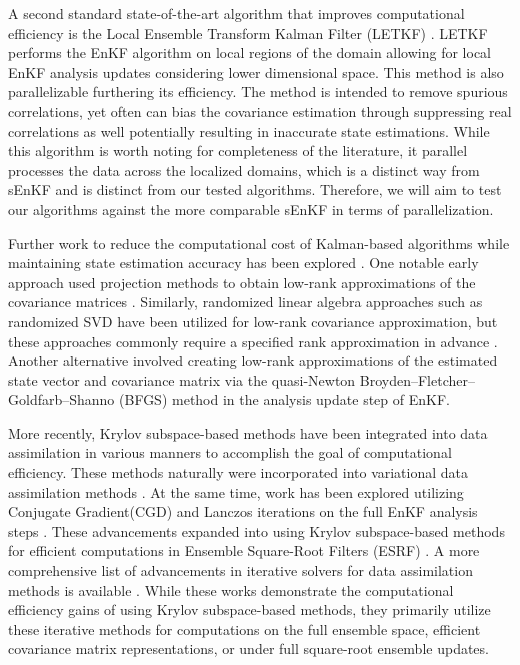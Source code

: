 \documentclass[11p]{elsarticle}
\numberwithin{equation}{section}
\begin{document}
{A second standard state-of-the-art algorithm that improves computational efficiency is the Local Ensemble Transform Kalman Filter (LETKF) \cite{Hunt2007, Szunyogh2008}.  LETKF performs the EnKF algorithm on local regions of the domain allowing for local EnKF analysis updates considering lower dimensional space.  This method is also parallelizable furthering its efficiency.  The method is intended to remove spurious correlations, yet often can bias the covariance estimation through suppressing real correlations as well potentially resulting in inaccurate state estimations.  While this algorithm is worth noting for completeness of the literature, it parallel processes the data across the localized domains, which is a distinct way from sEnKF and is distinct from our tested algorithms.  Therefore, we will aim to test our algorithms against the more comparable sEnKF in terms of parallelization.}

Further work to reduce the computational cost of Kalman-based algorithms while maintaining state estimation accuracy has been explored \cite{Bishop2001, evensen2003ensemble, Mandel2006, Nino-Ruiz2015}.  One notable early approach used projection methods to obtain low-rank approximations of the covariance matrices \cite{Dee1991, Cane1996}. 
{Similarly, randomized linear algebra approaches such as randomized SVD have been utilized for low-rank covariance approximation, but these approaches commonly require a specified rank approximation in advance \cite{Farchi2019}.}  Another alternative involved creating low-rank approximations of the estimated state vector and covariance matrix via the quasi-Newton Broyden–Fletcher–Goldfarb–Shanno (BFGS) method \cite{Auvinen2009} in the analysis update step of EnKF.

{More recently, Krylov subspace-based methods have been integrated into data assimilation in various manners to accomplish the goal of computational efficiency.  These methods naturally were incorporated into variational data assimilation methods \cite{Yaremchuk2009, Yaremchuk2015}.  At the same time, work has been explored utilizing Conjugate Gradient(CGD) and Lanczos iterations on the full EnKF analysis steps \cite{Bardsley2013, Bardsley2013-2}.  These advancements expanded into using Krylov subspace-based methods for efficient computations in Ensemble Square-Root Filters (ESRF) \cite{Steward2018,Armstrong2025}.  A more comprehensive list of advancements in iterative solvers for data assimilation methods is available \cite{Freitag2020}.  While these works demonstrate the computational efficiency gains of using Krylov subspace-based methods, they primarily utilize these iterative methods for computations on the full ensemble space, efficient covariance matrix representations, or under full square-root ensemble updates.}
\end{document}
